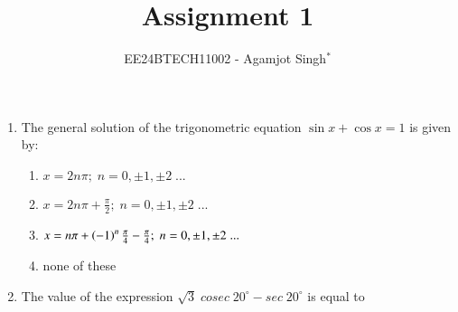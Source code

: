 \documentclass[journal,12pt,twocolumn]{IEEEtran}
\theoremstyle{remark}
\begin{document}

\title{Assignment 1}
\author{EE24BTECH11002 - Agamjot Singh$^{*}$%
}
\maketitle
\newpage
\bigskip

\begin{enumerate}

\section*{\color{black}\colorbox{gray}{ C. }\color{white}\colorbox{magenta}{MCQs with One Correct Answer}}
    \setcounter{enumi}{4}

    \item The general solution of the trigonometric equation $\sin {x} + \cos{x} = 1$ is given by:
        
        \begin{enumerate}[label={(\alph*)}]
            \item $x = 2n\pi;\;n = 0,\pm1,\pm2\;...$
            \item $x = 2n\pi+\frac{\pi}{2};\;n = 0,\pm1,\pm2\;...$
            \item $x = n\pi+\left(-1\right)^n\frac{\pi}{4}-\frac{\pi}{4};\;n = 0,\pm1,\pm2\;...$
            \item none of these
        \end{enumerate}

    \item The value of the expression $\sqrt{3}\;cosec\;20^\circ-sec\;20^\circ$ is equal to
        
        \begin{enumerate}[label={(\alph*)}]
        \end{enumerate}
        

\end{enumerate}
\end{document}
